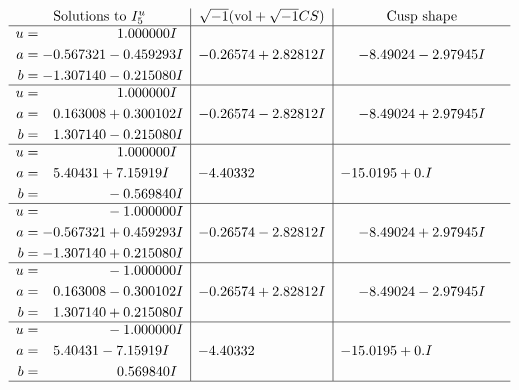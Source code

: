 \documentclass[1p]{elsarticle_modified}
\theoremstyle{definition}
\newcommand{\I}{\sqrt{-1}}
\begin{document}
$$\begin{array}{c|c|c}  
\text{Solutions to }I^u_{5}& \I (\text{vol} + \sqrt{-1}CS) & \text{Cusp shape}\\
 \hline 
\begin{aligned}
u &= \phantom{-0.000000 -}1.000000 I \\
a &= -0.567321 - 0.459293 I \\
b &= -1.307140 - 0.215080 I\end{aligned}
 & -0.26574 + 2.82812 I & -8.49024 - 2.97945 I \\ \hline\begin{aligned}
u &= \phantom{-0.000000 -}1.000000 I \\
a &= \phantom{-}0.163008 + 0.300102 I \\
b &= \phantom{-}1.307140 - 0.215080 I\end{aligned}
 & -0.26574 - 2.82812 I & -8.49024 + 2.97945 I \\ \hline\begin{aligned}
u &= \phantom{-0.000000 -}1.000000 I \\
a &= \phantom{-}5.40431 + 7.15919 I \\
b &= \phantom{-0.000000 } -0.569840 I\end{aligned}
 & -4.40332\phantom{ +0.000000I} & -15.0195 + 0. I\phantom{ +0.000000I} \\ \hline\begin{aligned}
u &= \phantom{-0.000000 } -1.000000 I \\
a &= -0.567321 + 0.459293 I \\
b &= -1.307140 + 0.215080 I\end{aligned}
 & -0.26574 - 2.82812 I & -8.49024 + 2.97945 I \\ \hline\begin{aligned}
u &= \phantom{-0.000000 } -1.000000 I \\
a &= \phantom{-}0.163008 - 0.300102 I \\
b &= \phantom{-}1.307140 + 0.215080 I\end{aligned}
 & -0.26574 + 2.82812 I & -8.49024 - 2.97945 I \\ \hline\begin{aligned}
u &= \phantom{-0.000000 } -1.000000 I \\
a &= \phantom{-}5.40431 - 7.15919 I \\
b &= \phantom{-0.000000 -}0.569840 I\end{aligned}
 & -4.40332\phantom{ +0.000000I} & -15.0195 + 0. I\phantom{ +0.000000I}\\
 \hline 
 \end{array}$$\newpage\newpage\renewcommand{\arraystretch}{1}
\end{document}
